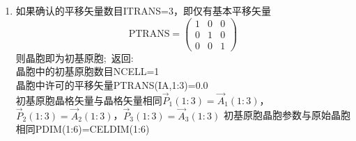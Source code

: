 \documentclass{article}      %
\begin{document}
\begin{enumerate}
	\item 如果确认的平移矢量数目\textrm{ITRANS}=3，即仅有基本平移矢量
		\begin{displaymath}
			\mathrm{PTRANS}= \begin{pmatrix}
				1 & 0 & 0\\
				0 & 1 & 0\\
				0 & 0 & 1
			\end{pmatrix}
		\end{displaymath}
		则晶胞即为初基原胞;~返回:\\
		晶胞中的初基原胞数目\textrm{NCELL}=1\\
		晶胞中许可的平移矢量\textrm{PTRANS(IA,1:3)}=0.0\\
		初基原胞晶格矢量与晶格矢量相同$\vec P_1(1:3)=\vec A_1(1:3)$，$\vec P_2(1:3)=\vec A_2(1:3)$，$\vec P_3(1:3)=\vec A_3(1:3)$
		初基原胞晶胞参数与原始晶胞相同\textrm{PDIM}(1:6)=\textrm{CELDIM}(1:6)
\end{enumerate}
\end{document}
